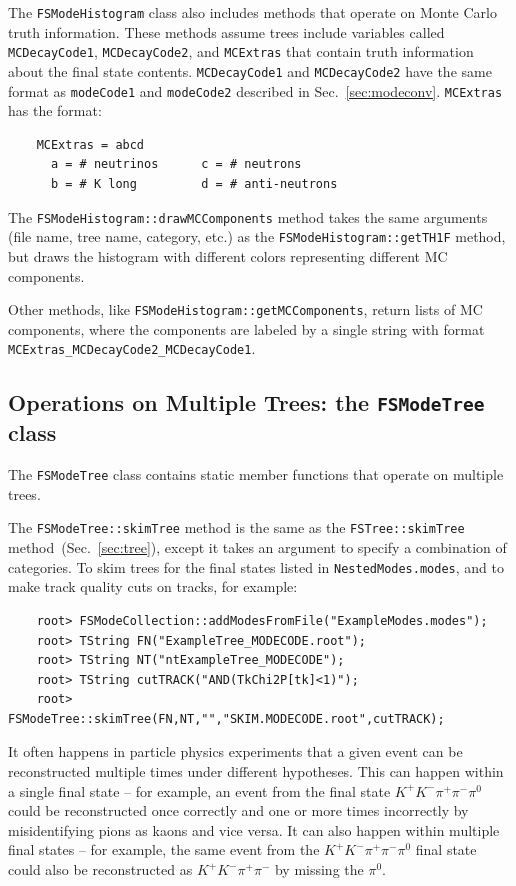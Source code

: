 \documentclass[11pt]{article}
\begin{document}
The {\tt FSModeHistogram} class also includes methods that operate on Monte Carlo truth information.  These methods assume trees include variables called {\tt MCDecayCode1}, {\tt MCDecayCode2}, and {\tt MCExtras} that contain truth information about the final state contents.  {\tt MCDecayCode1} and {\tt MCDecayCode2} have the same format as {\tt modeCode1} and {\tt modeCode2} described in Sec.~\ref{sec:modeconv}. {\tt MCExtras} has the format:
\begin{verbatim}
    MCExtras = abcd
      a = # neutrinos      c = # neutrons    
      b = # K long         d = # anti-neutrons
\end{verbatim}

The {\tt FSModeHistogram::drawMCComponents} method takes the same arguments (file name, tree name, category, etc.) as the {\tt FSModeHistogram::getTH1F} method, but draws the histogram with different colors representing different MC components.  

Other methods, like {\tt FSModeHistogram::getMCComponents}, return lists of MC components, where the components are labeled by a single string with format {\tt  MCExtras\_MCDecayCode2\_MCDecayCode1}.

\subsection{Operations on Multiple Trees: the {\tt FSModeTree} class}
\label{sec:modetree}

The {\tt FSModeTree} class contains static member functions that operate on multiple trees.

The {\tt FSModeTree::skimTree} method is the same as the {\tt FSTree::skimTree} method~(Sec.~\ref{sec:tree}), except it takes an argument to specify a combination of categories.  To skim trees for the final states listed in {\tt NestedModes.modes}, and to make track quality cuts on tracks, for example:
\begin{verbatim}
    root> FSModeCollection::addModesFromFile("ExampleModes.modes");
    root> TString FN("ExampleTree_MODECODE.root");  
    root> TString NT("ntExampleTree_MODECODE");
    root> TString cutTRACK("AND(TkChi2P[tk]<1)");
    root> FSModeTree::skimTree(FN,NT,"","SKIM.MODECODE.root",cutTRACK);
\end{verbatim}

It often happens in particle physics experiments that a given event can be reconstructed multiple times under different hypotheses.  This can happen within a single final state -- for example, an event from the final state $K^+K^-\pi^+\pi^-\pi^0$ could be reconstructed once correctly and one or more times incorrectly by misidentifying pions as kaons and vice versa.  It can also happen within multiple final states -- 
for example, the same event from the $K^+K^-\pi^+\pi^-\pi^0$ final state could also be reconstructed as $K^+K^-\pi^+\pi^-$ by missing the $\pi^0$.  
\end{document}
